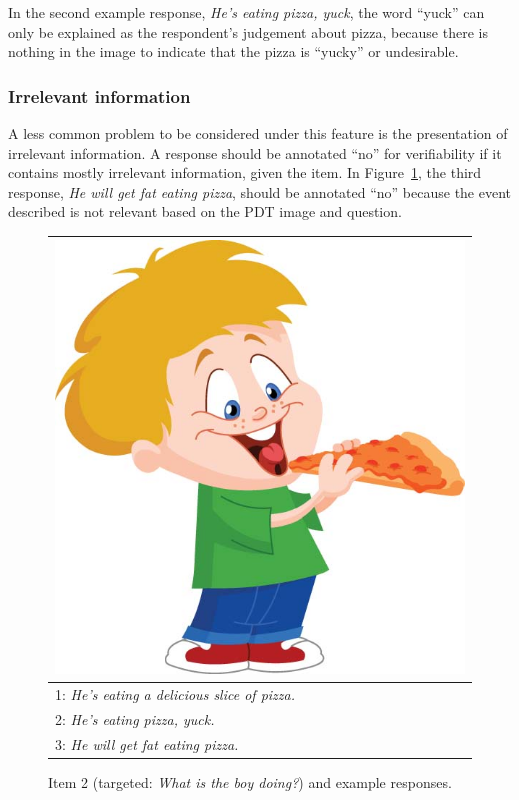 \documentclass[12pt,notitlepage]{article}
\newcommand{\lk}[1]{\marginpar{\linespread{1}\scriptsize LK: #1}}
\begin{document}
In the second example response, \textit{He's eating pizza, yuck}, the word ``yuck'' can only be explained as the respondent's judgement about pizza, because there is nothing in the image to indicate that the pizza is ``yucky'' or undesirable. 

\subsubsection{Irrelevant information} 
A less common problem to be considered under this feature is the presentation of irrelevant information. A response should be annotated ``no'' for verifiability if it contains mostly irrelevant information, given the item. In Figure~\ref{fig:eat-pizza}, the third response, \textit{He will get fat eating pizza}, should be annotated ``no'' because the event described is not relevant based on the PDT image and question.

\begin{figure}[h]
\begin{center}
\begin{tabular}{|l|}
\hline
\includegraphics[width=0.4\columnwidth,trim=0 0 0 -3]{figures/I02.jpg}\\
\hline
1: \textit{He's eating a delicious slice of pizza.} \\
\hline
2: \textit{He's eating pizza, yuck.} \\
\hline
3: \textit{He will get fat eating pizza.} \\
\hline
\end{tabular}
\end{center}
\caption{Item 2 (targeted: \textit{What is the boy doing?}) and example responses.}
\label{fig:eat-pizza}
\end{figure}

\newpage
\end{document}
